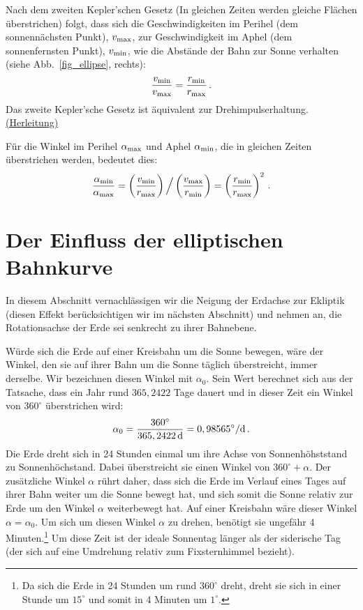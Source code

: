 Nach dem zweiten 
Kepler'schen Gesetz (\glqq In gleichen Zeiten werden gleiche Fl\"achen \"uberstrichen\grqq)
folgt, dass sich die Geschwindigkeiten im Perihel (dem sonnenn\"achsten Punkt), $v_{\rm max}$, 
zur Geschwindigkeit im Aphel (dem sonnenfernsten Punkt), $v_{\rm min}$, wie die Abst\"ande der Bahn
zur Sonne verhalten (siehe Abb.\ \ref{fig_ellipse}, rechts):
\begin{equation}
                 \frac{v_{\rm min}}{v_{\rm max}} =  \frac{r_{\rm min}}{r_{\rm max}}   \, .
\end{equation} 
Das zweite Kepler'sche Gesetz 
ist \"aquivalent zur Drehimpulserhaltung.\hyperref[sec_Zeitgleichung_A]{(Herleitung)}

F\"ur die Winkel im Perihel $\alpha_{\rm max}$ und Aphel $\alpha_{\rm min}$, 
die in gleichen Zeiten \"uberstrichen werden, bedeutet dies:
\begin{equation}
\label{eq_maxzumin}
      \frac{\alpha_{\rm min}}{\alpha_{\rm max}} 
      = \left( \frac{v_{\rm min}}{r_{\rm max}} \right) \Big/ \left( \frac{v_{\rm max}}{r_{\rm min}} \right) 
                 = \left( \frac{r_{\rm min}}{r_{\rm max}} \right)^2 \, .
\end{equation} 

\section{Der Einfluss der elliptischen Bahnkurve}
\label{sec_Ellipse}

In diesem Abschnitt vernachl\"assigen wir die Neigung der Erdachse zur Ekliptik (diesen
Effekt ber\"ucksichtigen wir im n\"achsten Abschnitt) und nehmen an, die Rotationsachse
der Erde sei senkrecht zu ihrer Bahnebene. 

W\"urde sich die Erde auf einer Kreisbahn um die Sonne bewegen, w\"are der Winkel, den
sie auf ihrer Bahn um die Sonne t\"aglich \"uberstreicht, immer derselbe. Wir bezeichnen diesen Winkel
mit $\alpha_0$. Sein Wert berechnet sich aus der Tatsache, dass ein Jahr rund $365,2422$ Tage
dauert und in dieser Zeit ein Winkel von $360^\circ$ \"uberstrichen wird:
\begin{equation}
                \alpha_0 = \frac{360^\circ}{365,2422\,{\rm d}} = 0,98565^\circ/{\rm d} \, . 
\end{equation} 
Die Erde dreht sich in 24 Stunden einmal um ihre Achse von Sonnenh\"ohststand zu
Sonnenh\"ochstand. Dabei \"uberstreicht sie einen Winkel von 
$360^\circ + \alpha$. Der zus\"atzliche Winkel $\alpha$ r\"uhrt daher, dass sich die Erde im
Verlauf eines Tages auf ihrer Bahn weiter um die Sonne bewegt hat, und sich somit
die Sonne relativ zur Erde um den Winkel $\alpha$ weiterbewegt hat. Auf einer
Kreisbahn w\"are dieser Winkel $\alpha=\alpha_0$. Um sich um diesen Winkel $\alpha$
zu drehen, ben\"otigt sie ungef\"ahr 4 Minuten.\footnote{Da sich die Erde in 24 Stunden um
rund $360^\circ$ dreht, dreht sie sich in einer Stunde um $15^\circ$ und somit in 4 Minuten
um $1^\circ$.} 
Um diese Zeit ist der ideale Sonnentag
l\"anger als der siderische Tag (der sich auf eine Umdrehung relativ zum Fixsternhimmel bezieht).

